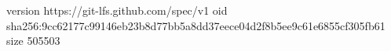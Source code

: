version https://git-lfs.github.com/spec/v1
oid sha256:9cc62177c99146eb23b8d77bb5a8dd37eece04d2f8b5ee9c61e6855cf305fb61
size 505503
